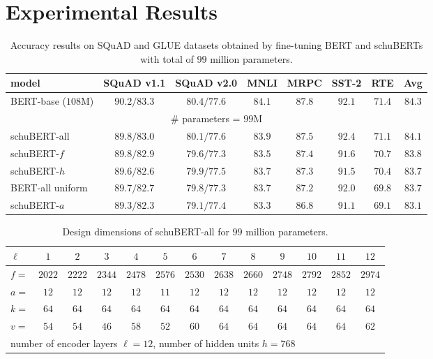 \documentclass[11pt,a4paper]{article}
\begin{document}
\section{Experimental Results}
\begin{table}[h]
\centering
\begin{tabular}{lcccccc|c}
model & SQuAD v1.1 & SQuAD v2.0 & MNLI & MRPC & SST-2 & RTE & Avg\\
\hline 
BERT-base ($108$M) & $90.2/83.3$ &$80.4/77.6$& $84.1$ & $87.8$ & $92.1$ & $71.4$ & $84.3$\\
\multicolumn{8}{c}{\# parameters = $99$M}\\
\hline
schuBERT-all & $\pmb{89.8/83.0}$ &$\pmb{80.1/77.6}$& $\pmb{83.9}$ & $\pmb{87.5}$ & $\pmb{92.4}$ & $\pmb{71.1}$ & $\pmb{84.1}$\\
schuBERT-$f$ & $89.8/82.9$ &$79.6/77.3$& $83.5$ & $87.4$ & $91.6$ & $70.7$ & $83.8$\\
schuBERT-$h$ & $89.6/82.6$ &$79.9/77.5$& $83.7$ & $87.3$ & $91.5$ & $70.4$ & $83.7$\\
BERT-all uniform & $89.7/82.7$ &$79.8/77.3$& $83.7$ & $87.2$ & $92.0$ & $69.8$ & $83.7$\\
schuBERT-$a$ & $89.3/82.3$ &$79.1/77.4$& $83.3$ & $86.8$ &$91.1$ &$69.1$ & $83.1$\\
\end{tabular}
\caption{\label{tab:results_99}Accuracy results on SQuAD and GLUE datasets obtained by fine-tuning BERT and schuBERTs with total of $99$ million parameters.}
\end{table}

\begin{table}[h]
\centering
\begin{tabular}{l|cccccccccccc}
\hline
$\ell$ & $1$ & $2$ & $3$ & $4$ & $5$ & $6$& $7$ &$8$ & $9$ & $10$ & $11$ & $12$\\
\hline
$f = $ & $2022$ &  $2222$ &  $2344$ & $2478$ & $2576$ & $2530$ &  $2638$ & $2660$ & $2748$ & $2792$ & $2852$ & $2974$\\
$a = $ & $12$ & $12$ & $12$ & $12$ & $11$ & $12$ & $12$ & $12$ &  $12$ & $12$ & $12$ & $12$\\
$k= $ &$64$ & $64$ & $64$ & $64$ & $64$ & $64$ & $64$ & $64$ & $64$ & $64$ & $64$ & $64$\\
$v = $ & $54$ & $54$ & $46$ & $58$ & $52$ & $60$ &  $64$ & $64$ & $64$ & $64$ & $64$ & $62$\\
\hline
\multicolumn{12}{l}{number of encoder layers $\ell=12$, number of hidden units $h=768$}\\
\end{tabular}
\caption{\label{tab:arch_99} Design dimensions of schuBERT-all for $99$ million parameters.}
\end{table}
\end{document}
